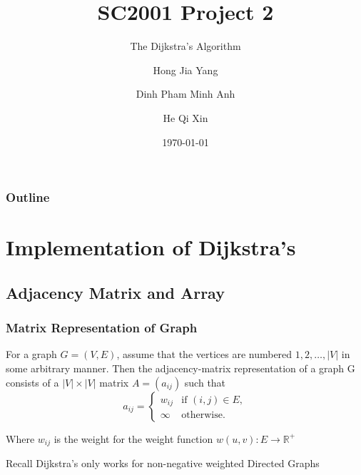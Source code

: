\documentclass{beamer}
\title{SC2001 Project 2}
\subtitle{The Dijkstra's Algorithm}
\author[Hong, Dinh, He]{Hong Jia Yang \and Dinh Pham Minh Anh \and He Qi Xin}
\institute{Team 4}
\date{\today}
\begin{document}
\begin{frame}
	\titlepage
\end{frame}

\begin{frame}
	\frametitle{Outline}
	\tableofcontents
\end{frame}

\section{Implementation of Dijkstra's}
\subsection{Adjacency Matrix and Array}

\begin{frame}
	\frametitle{Matrix Representation of Graph}
	For a graph \( G = (V, E) \), assume that the vertices are numbered \( 1, 2, \hdots, \lvert{ V }\rvert  \) in some arbitrary manner. Then the adjacency-matrix representation of a graph G consists of a \( \lvert{ V }\rvert \times \lvert{ V }\rvert  \) matrix \( A = (a_{ij}) \) such that
	\[
		a_{ij} = \begin{cases}
			w_{ij} & \text{if } (i, j) \in E,\\
			\infty & \text{otherwise.} 
		\end{cases}
	\]

	Where \( w_{ij} \) is the weight for the weight function \( w(u, v) : E \rightarrow \mathbb{R}^+ \) 
	\onslide<2> \begin{block}{Recall}
		Dijkstra's only works for non-negative weighted Directed Graphs	
	\end{block}
\end{frame}
\end{document}
